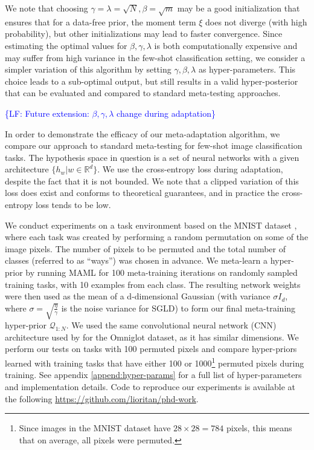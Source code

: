 \documentclass{article}
\theoremstyle{definition}
\newcommand{\LF}[1]{\textcolor{blue}{\{LF: #1\}}}
\begin{document}
We note that choosing $\gamma=\lambda=\sqrt{N}, \beta=\sqrt{m}$ may be a good initialization that ensures that for a data-free prior, the moment term $\xi$ does not diverge (with high probability), but other initializations may lead to faster convergence. Since estimating the optimal values for $\beta,\gamma,\lambda$ is both computationally expensive and may suffer from high variance in the few-shot classification setting, we consider a simpler variation of this algorithm by setting $\gamma, \beta, \lambda$ as hyper-parameters. This choice leads to a sub-optimal output, but still results in a valid hyper-posterior that can be evaluated and compared to standard meta-testing approaches.

\LF{Future extension: $\beta,\gamma,\lambda$ change during adaptation}

In order to demonstrate the efficacy of our meta-adaptation algorithm, we compare our approach to standard meta-testing for few-shot image classification tasks. The hypothesis space in question is a set of neural networks with a given architecture $\{h_w|w\in \mathbb{R}^d\}$. We use the cross-entropy loss during adaptation, despite the fact that it is not bounded. We note that a clipped variation of this loss does exist and conforms to theoretical guarantees, and in practice the cross-entropy loss tends to be low.

We conduct experiments on a task environment based on the MNIST dataset \citep{LeCun1998}, where each task was created by performing a random permutation on some of the image pixels. The number of pixels to be permuted and the total number of classes (referred to as ``ways'') was chosen in advance. We meta-learn a hyper-prior by running MAML \citep{Finn2017} for 100 meta-training iterations on randomly sampled training tasks, with 10 examples from each class. The resulting network weights were then used as the mean of a d-dimensional Gaussian (with variance $\sigma I_d$, where $\sigma=\sqrt{\frac{\eta}{\gamma}}$ is the noise variance for SGLD) to form our final meta-training hyper-prior $\mathcal{Q}_{1:N}$. We used the same convolutional neural network (CNN) architecture used by \citet{Vinyals2016} for the Omniglot dataset, as it has similar dimensions. We perform our tests on tasks with 100 permuted pixels and compare hyper-priors learned with training tasks that have either 100 or 1000\footnote{Since images in the MNIST dataset have $28\times 28=784$ pixels, this means that on average, all pixels were permuted.} permuted pixels during training. See appendix \ref{append:hyper-params} for a full list of hyper-parameters and implementation details. Code to reproduce our experiments is available at the following \hyperlink{Github repository}{https://github.com/lioritan/phd-work}.
\end{document}

